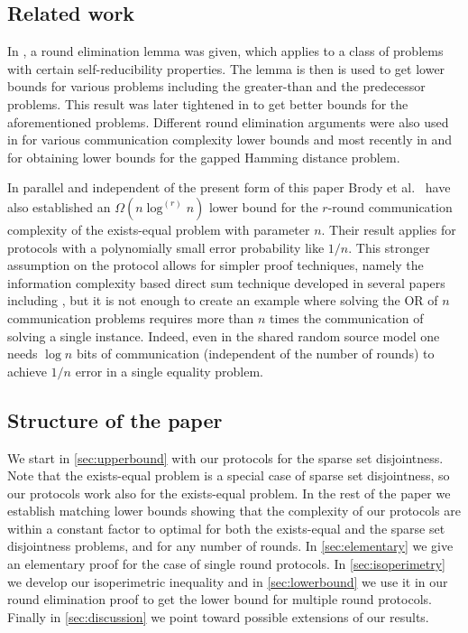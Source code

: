 \subsection{Related work} In \cite{MiltersenNSW1998}, a round
elimination lemma was given, which applies to a class of
problems with certain self-reducibility properties. The lemma is
then is used to get lower bounds for various problems including
the greater-than and the predecessor problems. This result was
later tightened in \cite{Sen2003} to get better bounds for the
aforementioned problems. Different round elimination arguments
were also used in \cite{KarchmerW1990, HalstenbergR1988,
NisanW1993,Miltersen1994, DurisGS1987,BeameF2001} for various
communication complexity lower bounds and most recently in
\cite{BrodyC2009} and \cite{BrodyCRVW2010} for obtaining lower
bounds for the gapped Hamming distance problem.

In parallel and independent of the present form of this paper
Brody et al.\ \cite{BrodyCK2012} have also established an
$\Omega(n\log^{(r)}n)$ lower bound for the $r$-round
communication complexity of the exists-equal problem with
parameter $n$. Their result applies for protocols with a
polynomially small error probability like $1/n$. This stronger
assumption on the protocol allows for simpler proof techniques,
namely the information complexity based direct sum technique
developed in several papers including
\cite{Ablayev1996,ChakrabartiSWY2001}, but it is not enough to
create an example where solving the OR of $n$ communication
problems requires more than $n$ times the communication of
solving a single instance. Indeed, even in the shared random
source model one needs $\log n$ bits of communication
(independent of the number of rounds) to achieve $1/n$ error in
a single equality problem.

\subsection{Structure of the paper}

We start in \autoref{sec:upperbound} with our protocols for the
sparse set disjointness. Note that the exists-equal problem is a
special case of sparse set disjointness, so our protocols work
also for the exists-equal problem. In the rest of the paper we
establish matching lower bounds showing that the complexity of
our protocols are within a constant factor to optimal for both
the exists-equal and the sparse set disjointness problems, and
for any number of rounds. In \autoref{sec:elementary} we give an
elementary proof for the case of single round protocols. In
\autoref{sec:isoperimetry} we develop our isoperimetric
inequality and in \autoref{sec:lowerbound} we use it in our
round elimination proof to get the lower bound for multiple
round protocols. Finally in \autoref{sec:discussion} we point
toward possible extensions of our results.
